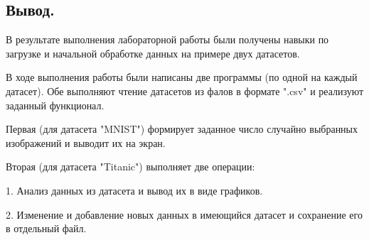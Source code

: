 \documentclass[a4paper]{article}
\begin{document}

\newpage
\begin{center}
\hfill \break
\section{Вывод.}
\end{center} 
\normalsize{
    В результате выполнения лабораторной работы были получены навыки по загрузке и начальной обработке данных на примере двух датасетов.
    
    В ходе выполнения работы были написаны две программы (по одной на каждый датасет). Обе выполняют чтение датасетов из фалов в формате ".csv" и реализуют заданный функционал.
    
    Первая (для датасета "MNIST") формирует заданное число случайно выбранных изображений и выводит их на экран.
    
    Вторая (для датасета "Titanic") выполняет две операции:
    
    1. Анализ данных из датасета и вывод их в виде графиков.
    
    2. Изменение и добавление новых данных в имеющийся датасет и сохранение его в отдельный файл.
}
\end{document}
